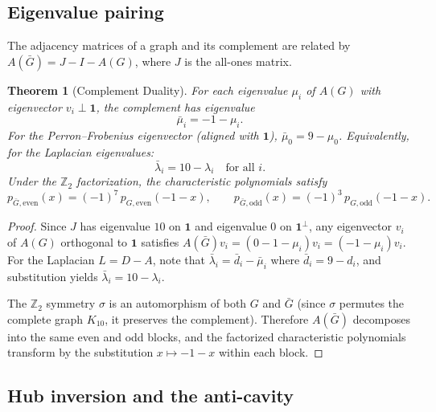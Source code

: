 \documentclass[11pt,a4paper]{amsart}
\newtheorem{theorem}{Theorem}[section]
\theoremstyle{remark}
\newcommand{\bbZ}{\mathbb{Z}}
\begin{document}
\subsection{Eigenvalue pairing}
\label{sec:eigenvalue-pairing}

The adjacency matrices of a graph and its complement are related by
$A(\bar{G}) = J - I - A(G)$, where $J$ is the all-ones matrix.

\begin{theorem}[Complement Duality]
\label{thm:complement}
For each eigenvalue $\mu_i$ of $A(G)$ with eigenvector $v_i \perp \mathbf{1}$,
the complement has eigenvalue
\begin{equation}
\bar{\mu}_i = -1 - \mu_i.
\end{equation}
For the Perron--Frobenius eigenvector (aligned with $\mathbf{1}$),
$\bar{\mu}_0 = 9 - \mu_0$. Equivalently, for the Laplacian eigenvalues:
\begin{equation}
\bar{\lambda}_i = 10 - \lambda_i \quad \text{for all } i.
\end{equation}
Under the $\bbZ_2$ factorization, the characteristic polynomials satisfy
\begin{equation}
p_{\bar{G},\mathrm{even}}(x) = (-1)^7 \, p_{G,\mathrm{even}}(-1-x),
\qquad
p_{\bar{G},\mathrm{odd}}(x) = (-1)^3 \, p_{G,\mathrm{odd}}(-1-x).
\end{equation}
\end{theorem}

\begin{proof}
Since $J$ has eigenvalue $10$ on $\mathbf{1}$ and eigenvalue $0$ on
$\mathbf{1}^\perp$, any eigenvector $v_i$ of $A(G)$ orthogonal to
$\mathbf{1}$ satisfies $A(\bar{G}) v_i = (0 - 1 - \mu_i) v_i = (-1 - \mu_i) v_i$.
For the Laplacian $L = D - A$, note that
$\bar{\lambda}_i = \bar{d}_i - \bar{\mu}_i$ where $\bar{d}_i = 9 - d_i$,
and substitution yields $\bar{\lambda}_i = 10 - \lambda_i$.

The $\bbZ_2$ symmetry $\sigma$ is an automorphism of both $G$ and $\bar{G}$
(since $\sigma$ permutes the complete graph $K_{10}$, it preserves the
complement). Therefore $A(\bar{G})$ decomposes into the same even and odd
blocks, and the factorized characteristic polynomials transform by the
substitution $x \mapsto -1 - x$ within each block.
\end{proof}

\subsection{Hub inversion and the anti-cavity}
\label{sec:hub-inversion}
\end{document}
